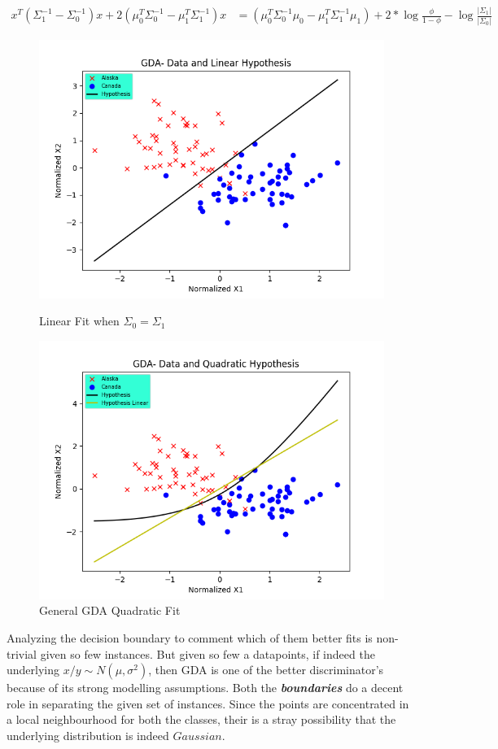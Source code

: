 \documentclass{article}
\newcommand{\italb}[1]{\textbf{\textit{#1}}}
\begin{document}
\begin{align*}
x^T(\Sigma_1^{-1}-\Sigma_0^{-1})x+2(\mu_0^T\Sigma_0^{-1}-\mu_1^T\Sigma_1^{-1})x&=(\mu_0^T\Sigma_0^{-1}\mu_0-\mu_1^T\Sigma_1^{-1}\mu_1)+2*\log{\frac{\phi}{1-\phi}}-\log{\frac{|\Sigma_1|}{|\Sigma_0|}}
\end{align*}

\begin{figure}[h]
\vspace*{-2cm}
\centering
\includegraphics[scale=0.9]{GDALinear.png}
\caption{Linear Fit when $\Sigma_0=\Sigma_1$}
\includegraphics[scale=0.9]{GDAQuad.png}
\caption{General GDA Quadratic Fit}
\end{figure}

Analyzing the decision boundary to comment which of them better fits is non-trivial given so few instances. But given so few a datapoints, if indeed the underlying $x/y \sim N(\mu,\sigma^2)$, then GDA is one of the better discriminator's because of its strong modelling assumptions. Both the \italb{boundaries} do a decent role in separating the given set of instances. Since the points are concentrated in a local neighbourhood for both the classes, their is a stray possibility that the underlying distribution is indeed $Gaussian$.
\end{document}
